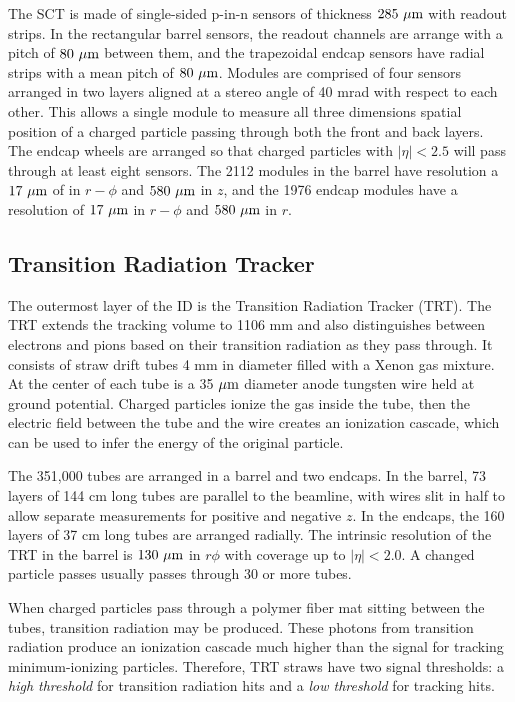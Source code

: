 The SCT is made of single-sided p-in-n sensors of thickness $285\ \mu \textrm{m}$ with readout strips. In the rectangular barrel sensors, the readout channels are arrange with a pitch of $80\ \mu \textrm{m}$ between them, and the trapezoidal endcap sensors have radial strips with a mean pitch of  $80\ \mu \textrm{m}$.  Modules are comprised of four sensors arranged in two layers aligned at a stereo angle of 40 mrad with respect to each other. This allows a single module to measure all three dimensions spatial position of a charged particle passing through both the front and back layers. The endcap wheels are arranged so that charged particles with $|\eta|<2.5$ will pass through at least eight sensors. The 2112 modules in the barrel have resolution a $17\ \mu \textrm{m}$ of in $r-\phi$ and $580\ \mu \textrm{m}$ in $z$, and the 1976 endcap modules have a resolution of $17\ \mu \textrm{m}$ in $r-\phi$ and $580\ \mu \textrm{m}$ in $r$.

\subsection{Transition Radiation Tracker}
The outermost layer of the ID is the Transition Radiation Tracker (TRT). The TRT extends the tracking volume to 1106 mm and also distinguishes between electrons and pions based on their transition radiation as they pass through. It consists of straw drift tubes 4 mm in diameter filled with a Xenon gas mixture. At the center of each tube is a 35 $\mu \textrm{m}$ diameter anode tungsten wire held at ground potential. Charged particles ionize the gas inside the tube, then the electric field between the tube and the wire creates an ionization cascade, which can be used to infer the energy of the original particle.

The 351,000 tubes are arranged in a barrel and two endcaps. In the barrel, 73 layers of 144 cm long tubes are parallel to the beamline, with wires slit in half to allow separate measurements for positive and negative $z$. In the endcaps, the 160 layers of 37 cm long tubes are arranged radially.  The intrinsic resolution of the TRT in the barrel is $130\ \mu \textrm{m}$ in $r\phi$ with coverage up to $|\eta|<2.0$. A changed particle passes usually passes through 30 or more tubes.

When charged particles pass through a polymer fiber mat sitting between the tubes, transition radiation may be produced. These photons from transition radiation produce an ionization cascade much higher than the signal for tracking minimum-ionizing particles. Therefore, TRT straws have two signal thresholds: a \emph{high threshold} for transition radiation hits and a \emph{low threshold} for tracking hits. 

